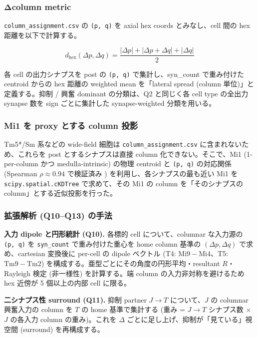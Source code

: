 \documentclass[11pt,a4paper]{ltjsarticle}
\begin{document}
\subsubsection*{Δcolumn metric}

\texttt{column\_assignment.csv} の \texttt{(p, q)} を axial hex coords とみなし、cell 間の hex 距離を以下で計算する。

\begin{equation}
d_\text{hex}(\Delta p, \Delta q) = \frac{|\Delta p| + |\Delta p + \Delta q| + |\Delta q|}{2}
\end{equation}

各 cell の出力シナプスを post の \texttt{(p, q)} で集計し、syn\_count で重み付けた centroid からの hex 距離の weighted mean を「lateral spread (column 単位)」と定義する。抑制 / 興奮 dominant の分類は、Q2 と同じく各 cell type の全出力 synapse 数を sign ごとに集計した synapse-weighted 分類を用いる。

\subsubsection*{Mi1 を proxy とする column 投影}

Tm5*/Sm 系などの wide-field 細胞は \texttt{column\_assignment.csv} に含まれないため、これらを post とするシナプスは直接 column 化できない。そこで、Mi1 (1-per-column かつ medulla-intrinsic) の物理 centroid と \texttt{(p, q)} の対応関係 (Spearman $\rho \approx 0.94$ で検証済み \cite{column_validation}) を利用し、各シナプスの最も近い Mi1 を \texttt{scipy.spatial.cKDTree} で求めて、その Mi1 の column を「そのシナプスの column」とする近似投影を行った。

\subsubsection*{拡張解析 (Q10--Q13) の手法}

\textbf{入力 dipole と円形統計 (Q10).} 各標的 cell について、columnar な入力源の \texttt{(p, q)} を \texttt{syn\_count} で重み付けた重心を home column 基準の $(\Delta p, \Delta q)$ で求め、cartesian 変換後に per-cell の dipole ベクトル (T4: $\mathrm{Mi9}-\mathrm{Mi4}$、T5: $\mathrm{Tm9}-\mathrm{Tm2}$) を構成する。亜型ごとにその角度の円形平均・resultant $R$・Rayleigh 検定 (非一様性) を計算する。端 column の入力非対称を避けるため hex 近傍が 5 個以上の内部 cell に限る。

\textbf{二シナプス性 surround (Q11).} 抑制 partner $J \to T$ について、$J$ の columnar 興奮入力の column を $T$ の home 基準で集計する (重み = $J\to T$ シナプス数 $\times$ $J$ の各入力 column の重み)。これを $\Delta$ ごとに足し上げ、抑制が「見ている」視空間 (surround) を再構成する。
\end{document}
